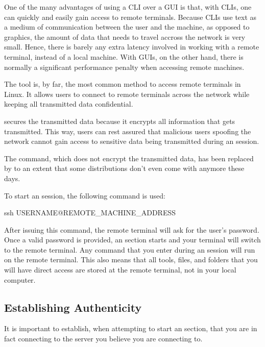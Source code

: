 One of the many advantages of using a \acs{CLI} over a \acs{GUI} is that, with \acs{CLI}s, one can quickly and easily gain access to remote terminals. Because \acs{CLI}s use text as a medium of communication between the user and the machine, as opposed to graphics, the amount of data that needs to travel accross the network is very small. Hence, there is barely any extra latency involved in working with a remote terminal, instead of a local machine. With \acs{GUI}s, on the other hand, there is normally a significant performance penalty when accessing remote machines. 

The  tool is, by far, the most common method to access remote terminals in Linux. It allows users to connect to remote terminals across the network while keeping all transmitted data confidential. 

 secures the transmitted data because it encrypts all information that gets transmitted. This way,  users can rest assured that malicious users spoofing the network cannot gain access to sensitive data being transmitted during an  session.

The  command, which does not encrypt the transmitted data, has been replaced by  to an extent that some distributions don’t even come with  anymore these days.

To start an  session, the following command is used:

\begin{command_line}[make]
ssh USERNAME@REMOTE_MACHINE_ADDRESS
\end{command_line}

After issuing this command, the remote terminal will ask for the user’s password. Once a valid password is provided, an  section starts and your terminal will switch to the remote terminal. Any command that you enter during an  session will run on the remote terminal. This  also means that all tools, files, and folders that you will have direct access are stored at the remote terminal, not in your local computer.

\subsection{Establishing Authenticity}

It is important to establish, when attempting to start an  section, that you are in fact connecting to the server you believe you are connecting to. 

